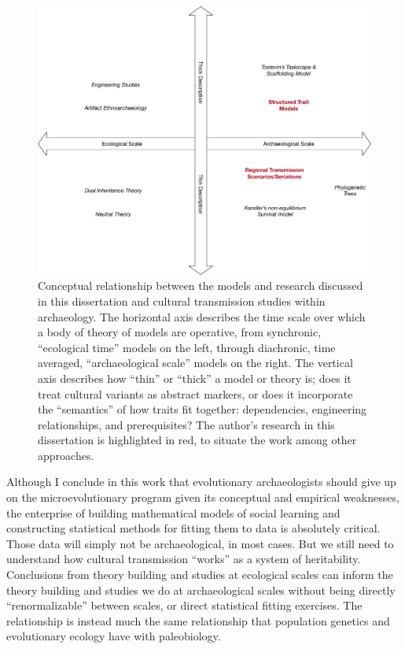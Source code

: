 \begin{figure}[ht!]
  \centering
  \includegraphics[scale=0.5]{graphics/conclusion/quadrant-diagram.pdf}
  \caption{Conceptual relationship between the models and research discussed in this dissertation and cultural transmission studies within archaeology.  The horizontal axis describes the time scale over which a body of theory of models are operative, from synchronic, ``ecological time'' models on the left, through diachronic, time averaged, ``archaeological scale'' models on the right.  The vertical axis describes how ``thin'' or ``thick'' a model or theory is; does it treat cultural variants as abstract markers, or does it incorporate the ``semantics'' of how traits fit together:  dependencies, engineering relationships, and prerequisites?  The author's research in this dissertation is highlighted in red, to situate the work among other approaches.}
  \label{conc:fig:quadrant-diagram}
\end{figure}

Although I conclude in this work that evolutionary archaeologists should give up on the microevolutionary program given its conceptual and empirical weaknesses, the enterprise of building mathematical models of social learning and constructing statistical methods for fitting them to data is absolutely critical.  Those data will simply not be archaeological, in most cases.  But we still need to understand how cultural transmission ``works'' as a system of heritability.  Conclusions from theory building and studies at ecological scales can inform the theory building and studies we do at archaeological scales without being directly ``renormalizable'' between scales, or direct statistical fitting exercises.  The relationship is instead much the same relationship that population genetics and evolutionary ecology have with paleobiology.  

